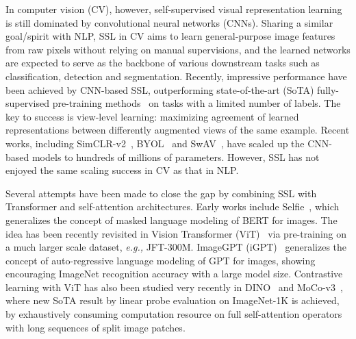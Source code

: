 \documentclass{article} \usepackage{iclr2022_conference,times}
\newcommand{\eg}[0]{\emph{e.g., }}
\begin{document}
In computer vision (CV), however, self-supervised visual representation learning is still dominated by convolutional neural networks (CNNs). Sharing a similar goal/spirit with NLP, SSL in CV aims to learn general-purpose image features from raw pixels without relying on manual supervisions, and the learned networks are expected to serve as the backbone of various downstream tasks such as classification, detection and segmentation. Recently, impressive performance have been achieved by CNN-based SSL, outperforming state-of-the-art (SoTA) fully-supervised pre-training methods~\citep{he2020momentum,caron2020unsupervised} on tasks with a limited number of labels. The key to success is view-level learning: maximizing agreement of learned representations between differently augmented views of the same example.  Recent works, including SimCLR-v2~\citep{chen2020big}, BYOL~\citep{grill2020bootstrap} and SwAV~\citep{caron2020unsupervised}, have scaled up the CNN-based models to hundreds of millions of parameters.
However, SSL has not enjoyed the same scaling success in CV as that in NLP.


 




Several attempts have been made to close the gap by combining SSL with Transformer and self-attention architectures. Early works include Selfie~\citep{trinh2019selfie}, which generalizes the concept of masked language modeling of BERT for images. The idea has been recently revisited in Vision Transformer (ViT)~\citep{dosovitskiy2020image} via pre-training on a much larger scale dataset, \eg JFT-300M.  ImageGPT (iGPT)~\citep{chen2020generative} generalizes the concept of auto-regressive language modeling of GPT for images, showing encouraging ImageNet recognition accuracy with a large model size. Contrastive learning with ViT has also been studied very recently in DINO~\citep{caron2021emerging} and MoCo-v3~\citep{chen2021empirical}, where new SoTA result by  linear probe evaluation on ImageNet-1K is achieved, by exhaustively consuming computation resource on full self-attention operators with long sequences of split image patches.
\end{document}
